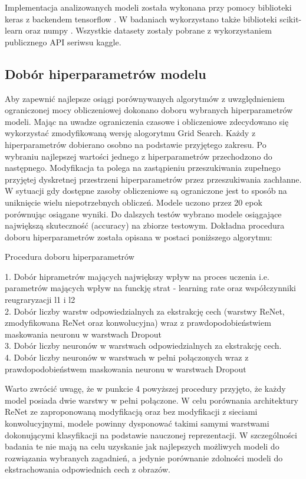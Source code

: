 \documentclass[oneside, mag]{mgr}
\begin{document}
Implementacja analizowanych modeli została wykonana przy pomocy biblioteki keras \cite{keras} z backendem tensorflow \cite{tensorflow}. W badaniach wykorzystano także biblioteki scikit-learn \cite{scikit-learn} oraz numpy \cite{numpy}. Wszystkie datasety zostały pobrane z wykorzystaniem publicznego API seriwsu kaggle.

\subsection{Dobór hiperparametrów modelu}

Aby zapewnić najlepsze osiągi porównywanych algorytmów z uwzględnieniem ograniczonej mocy obliczeniowej dokonano doboru wybranych hiperparametrów modeli. Mając na uwadze ograniczenia czasowe i obliczeniowe zdecydowano się wykorzystać zmodyfikowaną wersję alogorytmu Grid Search. Każdy z hiperparametrów dobierano osobno na podstawie przyjętego zakresu. Po wybraniu najlepszej wartości jednego z hiperparametrów przechodzono do następnego. Modyfikacja ta polega na zastąpieniu przeszukiwania zupełnego przyjętej dyskretnej przestrzeni hiperparametrów przez przeszukiwania zachłanne. W sytuacji gdy dostępne zasoby obliczeniowe są ograniczone jest to sposób na uniknięcie wielu niepotrzebnych obliczeń. Modele uczono przez 20 epok porównując osiągane wyniki. Do dalszych testów wybrano modele osiągające największą skuteczność (accuracy) na zbiorze testowym. Dokładna procedura doboru hiperparametrów została opisana w postaci poniższego algorytmu:

\begin{algorithm}[H]
\SetAlgoLined
\caption{Procedura doboru hiperparametrów}
1. Dobór hiprametrów mających największy wpływ na proces uczenia i.e. parametrów mających wpływ na funckję strat - learning rate oraz współczynniki reugraryzacji l1 i l2\\
2. Dobór liczby warstw odpowiedzialnych za ekstrakcję cech (warstwy ReNet, zmodyfikowana ReNet oraz konwolucyjna) wraz z prawdopodobieństwiem maskowania neuronu w warstwach Dropout\\
3. Dobór liczby neuronów w warstwach odpowiedzialnych za ekstrakcję cech.\\
4. Dobór liczby neuronów w warstwach w pełni połączonych wraz z prawdopodobieństwem maskowania neuronu w warstwach Dropout\\
\end{algorithm}

Warto zwrócić uwagę, że w punkcie 4 powyższej procedury przyjęto, że każdy model posiada dwie warstwy w pełni połączone. W celu porównania architektury ReNet ze zaproponowaną modyfikacją oraz bez modyfikacji z sieciami konwolucyjnymi, modele powinny dysponować takimi samymi warstwami dokonującymi klasyfikacji na podstawie nauczonej reprezentacji. W szczególności badania te nie mają na celu uzyskanie jak najlepszych możliwych modeli do rozwiązania wybranych zagadnień, a jedynie porównanie zdolności modeli do ekstrachowania odpowiednich cech z obrazów.
\end{document}
